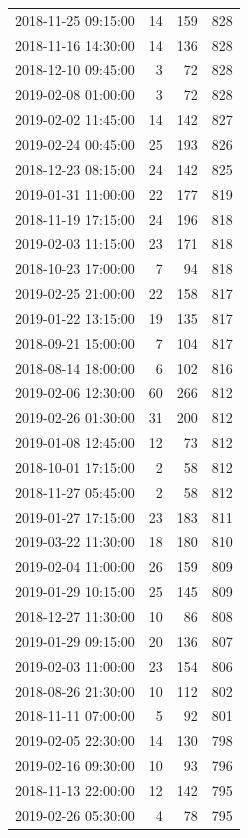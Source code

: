 \begin{tabular}{lrrr}
2018-11-25 09:15:00 & 14 & 159 & 828 \\
2018-11-16 14:30:00 & 14 & 136 & 828 \\
2018-12-10 09:45:00 & 3 & 72 & 828 \\
2019-02-08 01:00:00 & 3 & 72 & 828 \\
2019-02-02 11:45:00 & 14 & 142 & 827 \\
2019-02-24 00:45:00 & 25 & 193 & 826 \\
2018-12-23 08:15:00 & 24 & 142 & 825 \\
2019-01-31 11:00:00 & 22 & 177 & 819 \\
2018-11-19 17:15:00 & 24 & 196 & 818 \\
2019-02-03 11:15:00 & 23 & 171 & 818 \\
2018-10-23 17:00:00 & 7 & 94 & 818 \\
2019-02-25 21:00:00 & 22 & 158 & 817 \\
2019-01-22 13:15:00 & 19 & 135 & 817 \\
2018-09-21 15:00:00 & 7 & 104 & 817 \\
2018-08-14 18:00:00 & 6 & 102 & 816 \\
2019-02-06 12:30:00 & 60 & 266 & 812 \\
2019-02-26 01:30:00 & 31 & 200 & 812 \\
2019-01-08 12:45:00 & 12 & 73 & 812 \\
2018-10-01 17:15:00 & 2 & 58 & 812 \\
2018-11-27 05:45:00 & 2 & 58 & 812 \\
2019-01-27 17:15:00 & 23 & 183 & 811 \\
2019-03-22 11:30:00 & 18 & 180 & 810 \\
2019-02-04 11:00:00 & 26 & 159 & 809 \\
2019-01-29 10:15:00 & 25 & 145 & 809 \\
2018-12-27 11:30:00 & 10 & 86 & 808 \\
2019-01-29 09:15:00 & 20 & 136 & 807 \\
2019-02-03 11:00:00 & 23 & 154 & 806 \\
2018-08-26 21:30:00 & 10 & 112 & 802 \\
2018-11-11 07:00:00 & 5 & 92 & 801 \\
2019-02-05 22:30:00 & 14 & 130 & 798 \\
2019-02-16 09:30:00 & 10 & 93 & 796 \\
2018-11-13 22:00:00 & 12 & 142 & 795 \\
2019-02-26 05:30:00 & 4 & 78 & 795 \\

\end{tabular}
